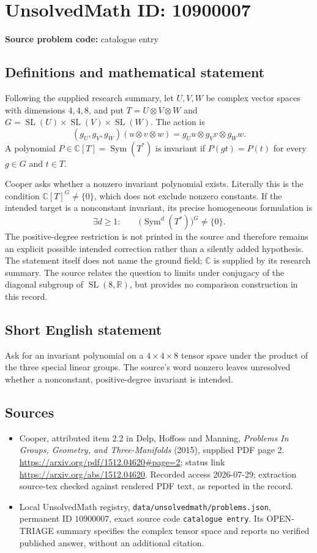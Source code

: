 \documentclass[11pt]{article}
\newcommand{\R}{\mathbb{R}}
\newcommand{\C}{\mathbb{C}}
\begin{document}
\section*{UnsolvedMath ID: 10900007}
\textbf{Source problem code:} catalogue entry
\subsection{Definitions and mathematical statement}
Following the supplied research summary, let \(U,V,W\) be complex vector spaces with dimensions \(4,4,8\), and put \(T=U\otimes V\otimes W\) and \(G=\operatorname{SL}(U)\times\operatorname{SL}(V)\times\operatorname{SL}(W)\). The action is
\[
 (g_U,g_V,g_W)(u\otimes v\otimes w)
   =g_Uu\otimes g_Vv\otimes g_Ww.
\]
A polynomial \(P\in\C[T]=\operatorname{Sym}(T^*)\) is invariant if \(P(gt)=P(t)\) for every \(g\in G\) and \(t\in T\).

Cooper asks whether a nonzero invariant polynomial exists. Literally this is the condition \(\C[T]^G\ne\{0\}\), which does not exclude nonzero constants. If the intended target is a nonconstant invariant, its precise homogeneous formulation is
\[
 \exists d\geq1:\qquad
 \bigl(\operatorname{Sym}^d(T^*)\bigr)^G\ne\{0\}.
\]
The positive-degree restriction is not printed in the source and therefore remains an explicit possible intended correction rather than a silently added hypothesis. The statement itself does not name the ground field; \(\C\) is supplied by its research summary. The source relates the question to limits under conjugacy of the diagonal subgroup of \(\operatorname{SL}(8,\R)\), but provides no comparison construction in this record.
\subsection{Short English statement}
Ask for an invariant polynomial on a \(4\times4\times8\) tensor space under the product of the three special linear groups. The source's word nonzero leaves unresolved whether a nonconstant, positive-degree invariant is intended.
\subsection{Sources}
\begin{itemize}
\item Cooper, attributed item 2.2 in Delp, Hoffoss and Manning, \emph{Problems In Groups, Geometry, and Three-Manifolds} (2015), supplied PDF page 2. \url{https://arxiv.org/pdf/1512.04620#page=2}; status link \url{https://arxiv.org/abs/1512.04620}. Recorded access 2026-07-29; extraction source-tex checked against rendered PDF text, as reported in the record.
\item Local UnsolvedMath registry, \texttt{data/unsolvedmath/problems.json}, permanent ID \(10900007\), exact source code \texttt{catalogue entry}. Its OPEN-TRIAGE summary specifies the complex tensor space and reports no verified published answer, without an additional citation.
\end{itemize}
\end{document}
